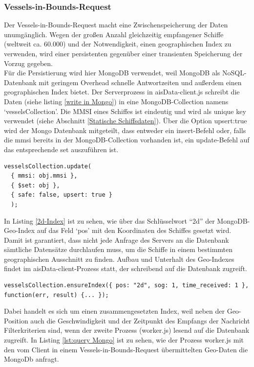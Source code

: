 \subsubsection{Vessels-in-Bounds-Request}\label{Vessels-in-Bounds-Request}
Der Vessels-in-Bounds-Request macht eine Zwischenspeicherung der Daten unumgänglich. Wegen der großen Anzahl gleichzeitig empfangener Schiffe (weltweit ca. 60.000) und der Notwendigkeit, einen geographischen Index zu verwenden, wird einer persistenten gegenüber einer transienten Speicherung der Vorzug gegeben. 
\\Für die Persistierung wird hier MongoDB verwendet, weil MongoDB als NoSQL-Datenbank mit geringem Overhead schnelle Antwortzeiten und außerdem einen geographischen Index bietet. Der Serverprozess in aisData-client.js schreibt die Daten (siehe listing \ref{write in Mongo}) in eine MongoDB-Collection namens ‘vesselsCollection’. Die MMSI eines Schiffes ist eindeutig und wird als unique key verwendet (siehe Abschnitt \ref{Statische Schiffsdaten}). Über die Option upsert:true wird der Mongo Datenbank mitgeteilt, dass entweder ein insert-Befehl oder, falls die mmsi bereits in der MongoDB-Collection vorhanden ist, ein update-Befehl auf das entsprechende set auszuführen ist. 
\begin{lstlisting}[caption=Schreiben in die Datenbank in aisData-client.js, label=write in Mongo]
vesselsCollection.update(
  { mmsi: obj.mmsi },
  { $set: obj },
  { safe: false, upsert: true }
  );
\end{lstlisting}
In Listing \ref{2d-Index} ist zu sehen, wie über das Schlüsselwort “2d” der MongoDB-Geo-Index auf das Feld ‘pos’ mit den Koordinaten des Schiffes gesetzt wird. Damit ist garantiert, dass nicht jede Anfrage des Servers an die Datenbank sämtliche Datensätze durchlaufen muss, um die Schiffe in einem bestimmten geographischen Ausschnitt zu finden. Aufbau und Unterhalt des Geo-Indexes findet im aisData-client-Prozess statt, der schreibend auf die Datenbank zugreift.
\begin{lstlisting}[caption=Aufbau des Geo-Indexes in aisData-client.js, label= 2d-Index]
  vesselsCollection.ensureIndex({ pos: "2d", sog: 1, time_received: 1 }, function(err, result) {... });
  \end{lstlisting}
Dabei handelt es sich um einen zusammengesetzten Index, weil neben der Geo-Position auch die Geschwindigkeit und der Zeitpunkt des Empfangs der Nachricht Filterkriterien sind, wenn der zweite Prozess (worker.js) lesend auf die Datenbank zugreift. In Listing \ref{lst:query Mongo} ist zu sehen, wie der Prozess worker.js mit den vom Client in einem Vessels-in-Bounds-Request übermittelten Geo-Daten die MongoDb anfragt.
